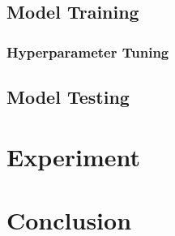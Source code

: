\documentclass[paper=a4, fontsize=11pt]{scrartcl}
\numberwithin{equation}{section}		%
\numberwithin{table}{section}				%
\begin{document}
\subsection{Model Training}

\subsubsection{Hyperparameter Tuning}

\subsection{Model Testing}

\section{Experiment}\label{sec: experiment}

\section{Conclusion}\label{sec: conlusion}

 
\clearpage
 




\end{document}
